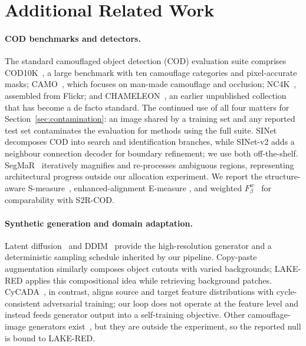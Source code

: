 \documentclass{article}
\begin{document}
\section{Additional Related Work}
\label{app:related}

\paragraph{COD benchmarks and detectors.}
The standard camouflaged object detection (COD) evaluation suite comprises COD10K~\citep{fan2022concealed}, a large benchmark
with ten camouflage categories and pixel-accurate masks; CAMO~\citep{le2019anabranch}, which focuses
on man-made camouflage and occlusion; NC4K~\citep{lv2021simultaneously}, assembled from Flickr; and
CHAMELEON~\citep{skurowski2018animal}, an earlier unpublished collection that has become a de facto
standard. The continued use of all four matters for Section~\ref{sec:contamination}: an image shared by a training set and any reported test set contaminates the evaluation for methods using the full suite.
SINet~\citep{fan2020sinet} decomposes COD into search and identification branches, while SINet-v2
\citep{fan2022concealed} adds a neighbour connection decoder for boundary refinement; we use both
off-the-shelf. SegMaR~\citep{jia2022segment} iteratively magnifies and re-processes ambiguous
regions, representing architectural progress outside our allocation experiment. We report the
structure-aware S-measure~\citep{fan2017structure}, enhanced-alignment E-measure
\citep{fan2018enhanced}, and weighted $F_\beta^w$~\citep{margolin2014evaluate} for comparability
with S2R-COD.

\paragraph{Synthetic generation and domain adaptation.}
Latent diffusion~\citep{rombach2022high} and DDIM~\citep{song2021denoising} provide the high-resolution
generator and a deterministic sampling schedule inherited by our pipeline. Copy-paste augmentation
\citep{ghiasi2021simple} similarly composes object cutouts with varied backgrounds; LAKE-RED applies
this compositional idea while retrieving background patches. CyCADA~\citep{hoffman2018cycada}, in
contrast, aligns source and target feature distributions with cycle-consistent adversarial training; our loop does not operate at the feature level and instead feeds generator output into a
self-training objective. Other camouflage-image generators exist~\citep{chen2025realcamo}, but they
are outside the experiment, so the reported null is bound to LAKE-RED.
\end{document}
